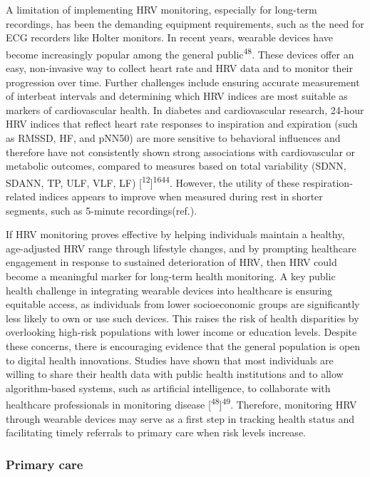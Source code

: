 \documentclass[
  a4paper,
  headsepline=true,
  open=any]{scrbook}
\begin{document}
A limitation of implementing HRV monitoring, especially for long-term
recordings, has been the demanding equipment requirements, such as the
need for ECG recorders like Holter monitors. In recent years, wearable
devices have become increasingly popular among the general
public\textsuperscript{48}. These devices offer an easy, non-invasive
way to collect heart rate and HRV data and to monitor their progression
over time. Further challenges include ensuring accurate measurement of
interbeat intervals and determining which HRV indices are most suitable
as markers of cardiovascular health. In diabetes and cardiovascular
research, 24-hour HRV indices that reflect heart rate responses to
inspiration and expiration (such as RMSSD, HF, and pNN50) are more
sensitive to behavioral influences and therefore have not consistently
shown strong associations with cardiovascular or metabolic outcomes,
compared to measures based on total variability (SDNN, SDANN, TP, ULF,
VLF, LF)
{[}\textsuperscript{12}{]}\textsuperscript{16}\textsuperscript{44}.
However, the utility of these respiration-related indices appears to
improve when measured during rest in shorter segments, such as 5-minute
recordings(ref.).

If HRV monitoring proves effective by helping individuals maintain a
healthy, age-adjusted HRV range through lifestyle changes, and by
prompting healthcare engagement in response to sustained deterioration
of HRV, then HRV could become a meaningful marker for long-term health
monitoring. A key public health challenge in integrating wearable
devices into healthcare is ensuring equitable access, as individuals
from lower socioeconomic groups are significantly less likely to own or
use such devices. This raises the risk of health disparities by
overlooking high-risk populations with lower income or education levels.
Despite these concerns, there is encouraging evidence that the general
population is open to digital health innovations. Studies have shown
that most individuals are willing to share their health data with public
health institutions and to allow algorithm-based systems, such as
artificial intelligence, to collaborate with healthcare professionals in
monitoring disease {[}\textsuperscript{48}{]}\textsuperscript{49}.
Therefore, monitoring HRV through wearable devices may serve as a first
step in tracking health status and facilitating timely referrals to
primary care when risk levels increase.

\hypertarget{primary-care}{%
\subsubsection{Primary care}\label{primary-care}}
\end{document}
